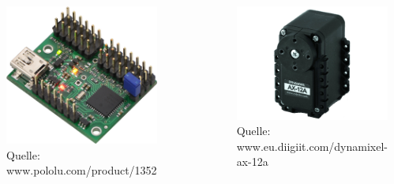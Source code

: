 \begin{frame}
	\begin{columns}[t]
		\begin{figure}
			\centering
			\includegraphics[width=0.7\columnwidth]{../images/maestroServoController.jpg}
			\caption{Quelle: www.pololu.com/product/1352}
		\end{figure}
		\begin{figure}
			\centering
			\includegraphics[width=0.9\columnwidth]{../images/dynamixelAX12A.jpg}
			\caption{Quelle: www.eu.diigiit.com/dynamixel-ax-12a}
		\end{figure}
	\end{columns}
	
\end{frame}

